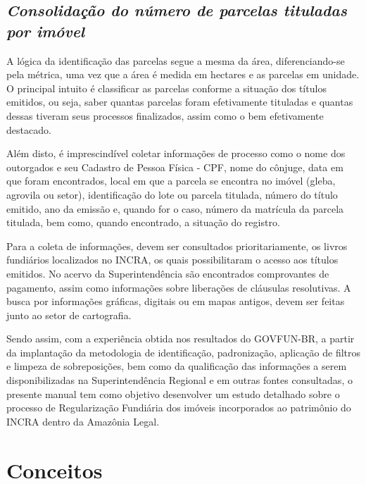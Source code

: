 \documentclass[
  letterpaper,
]{report}
\begin{document}
\hypertarget{consolidauxe7uxe3o-do-nuxfamero-de-parcelas-tituladas-por-imuxf3vel}{%
\subsection{\texorpdfstring{\emph{Consolidação do número de parcelas
tituladas por
imóvel}}{Consolidação do número de parcelas tituladas por imóvel}}\label{consolidauxe7uxe3o-do-nuxfamero-de-parcelas-tituladas-por-imuxf3vel}}

A lógica da identificação das parcelas segue a mesma da área,
diferenciando-se pela métrica, uma vez que a área é medida em hectares e
as parcelas em unidade. O principal intuito é classificar as parcelas
conforme a situação dos títulos emitidos, ou seja, saber quantas
parcelas foram efetivamente tituladas e quantas dessas tiveram seus
processos finalizados, assim como o bem efetivamente destacado.

Além disto, é imprescindível coletar informações de processo como o nome
dos outorgados e seu Cadastro de Pessoa Física - CPF, nome do cônjuge,
data em que foram encontrados, local em que a parcela se encontra no
imóvel (gleba, agrovila ou setor), identificação do lote ou parcela
titulada, número do título emitido, ano da emissão e, quando for o caso,
número da matrícula da parcela titulada, bem como, quando encontrado, a
situação do registro.

Para a coleta de informações, devem ser consultados prioritariamente, os
livros fundiários localizados no INCRA, os quais possibilitaram o acesso
aos títulos emitidos. No acervo da Superintendência são encontrados
comprovantes de pagamento, assim como informações sobre liberações de
cláusulas resolutivas. A busca por informações gráficas, digitais ou em
mapas antigos, devem ser feitas junto ao setor de cartografia.

Sendo assim, com a experiência obtida nos resultados do GOVFUN-BR, a
partir da implantação da metodologia de identificação, padronização,
aplicação de filtros e limpeza de sobreposições, bem como da
qualificação das informações a serem disponibilizadas na
Superintendência Regional e em outras fontes consultadas, o presente
manual tem como objetivo desenvolver um estudo detalhado sobre o
processo de Regularização Fundiária dos imóveis incorporados ao
patrimônio do INCRA dentro da Amazônia Legal.

\hypertarget{conceitos}{%
\section{Conceitos}\label{conceitos}}
\end{document}
